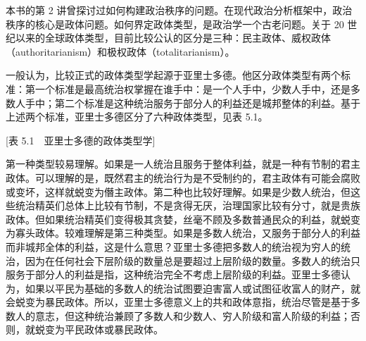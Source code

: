 





本书的第 2 讲曾探讨过如何构建政治秩序的问题。在现代政治分析框架中，政治秩序的核心是政体问题。如何界定政体类型，是政治学一个古老问题。关于 20 世纪以来的全球政体类型，目前比较公认的区分是三种：民主政体、威权政体（authoritarianism）和极权政体（totalitarianism）。

一般认为，比较正式的政体类型学起源于亚里士多德。他区分政体类型有两个标准：第一个标准是最高统治权掌握在谁手中：是一个人手中，少数人手中，还是多数人手中；第二个标准是这种统治服务于部分人的利益还是城邦整体的利益。基于上述两个标准，亚里士多德区分了六种政体类型，见表 5.1。

[表 5.1　亚里士多德的政体类型学]

第一种类型较易理解。如果是一人统治且服务于整体利益，就是一种有节制的君主政体。可以理解的是，既然君主的统治行为是不受制约的，君主政体有可能会腐败或变坏，这样就蜕变为僭主政体。第二种也比较好理解。如果是少数人统治，但这些统治精英们总体上比较有节制，不是贪得无厌，治理国家比较有分寸，就是贵族政体。但如果统治精英们变得极其贪婪，丝毫不顾及多数普通民众的利益，就蜕变为寡头政体。较难理解是第三种类型。如果是多数人统治，又服务于部分人的利益而非城邦全体的利益，这是什么意思？亚里士多德把多数人的统治视为穷人的统治，因为在任何社会下层阶级的数量总是要超过上层阶级的数量。多数人的统治只服务于部分人的利益是指，这种统治完全不考虑上层阶级的利益。亚里士多德认为，如果以平民为基础的多数人的统治试图要迫害富人或试图征收富人的财产，就会蜕变为暴民政体。所以，亚里士多德意义上的共和政体意指，统治尽管是基于多数人的意志，但这种统治兼顾了多数人和少数人、穷人阶级和富人阶级的利益；否则，就蜕变为平民政体或暴民政体。

